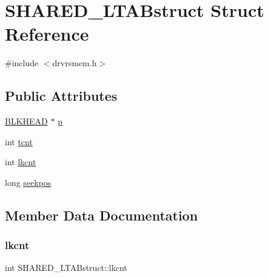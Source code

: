 \hypertarget{struct_s_h_a_r_e_d___l_t_a_bstruct}{}\section{S\+H\+A\+R\+E\+D\+\_\+\+L\+T\+A\+Bstruct Struct Reference}
\label{struct_s_h_a_r_e_d___l_t_a_bstruct}


{\ttfamily \#include $<$drvrsmem.\+h$>$}

\subsection*{Public Attributes}
\begin{DoxyCompactItemize}
\item 
\hyperlink{union_b_l_k_h_e_a_d}{B\+L\+K\+H\+E\+AD} $\ast$ \hyperlink{struct_s_h_a_r_e_d___l_t_a_bstruct_a088554f35e75dc7cd4cd5805d6abb445}{p}
\item 
int \hyperlink{struct_s_h_a_r_e_d___l_t_a_bstruct_af6f5781333e3a9fba9892dc25c7fa306}{tcnt}
\item 
int \hyperlink{struct_s_h_a_r_e_d___l_t_a_bstruct_a8cfe9f6ee0b70894517b4a607983c54b}{lkcnt}
\item 
long \hyperlink{struct_s_h_a_r_e_d___l_t_a_bstruct_aa4ceb453da927584718ca61eca0456df}{seekpos}
\end{DoxyCompactItemize}


\subsection{Member Data Documentation}
\mbox{\label{struct_s_h_a_r_e_d___l_t_a_bstruct_a8cfe9f6ee0b70894517b4a607983c54b}} 
\subsubsection{\texorpdfstring{lkcnt}{lkcnt}}
{\footnotesize\ttfamily int S\+H\+A\+R\+E\+D\+\_\+\+L\+T\+A\+Bstruct\+::lkcnt}

\mbox{\label{struct_s_h_a_r_e_d___l_t_a_bstruct_a088554f35e75dc7cd4cd5805d6abb445}} 
